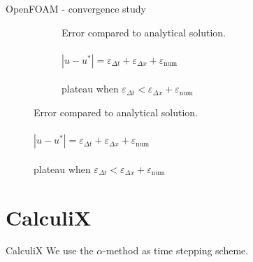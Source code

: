 \documentclass[
  english,            %
  aspectratio=43,    %
]{tumbeamer}
\begin{document}
\begin{frame}{OpenFOAM - convergence study}
\begin{figure}[!htbp]
\begin{subfigure}[b]{0.49\textwidth}
      \caption{Error compared to analytical solution. \\ \\
      $|u - u^*| = \varepsilon_{\Delta t} + \varepsilon_{\Delta x} + \varepsilon_\text{num}$ \\ \\
      plateau when $\varepsilon_{\Delta t} < \varepsilon_{\Delta x} + \varepsilon_\text{num}$
      }
      \label{fig:RMSE_openfoam}
    \end{subfigure}
    \label{fig:figures}
  \end{figure}
\end{frame}

\section{CalculiX}
\begin{frame}{CalculiX}
\vspace{10pt}
We use the $\alpha$-method as time stepping scheme.
\vspace{10pt}


\end{frame}
\end{document}
